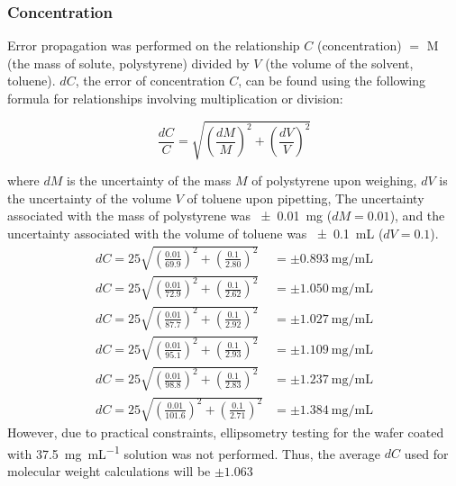 \documentclass[twocolumn]{article}
\begin{document}
                \subsubsection{Concentration}
                    Error propagation was performed on the relationship $C$ (concentration) $=$ M (the mass of solute, polystyrene) divided by $V$ (the volume of the solvent, toluene). $dC$, the error of concentration $C$, can be found using the following formula for relationships involving multiplication or division: 
                    
                    \begin{equation}
                        \frac{dC}{C} = \sqrt{(\frac{dM}{M})^2 + (\frac{dV}{V})^2}
                    \end{equation}
                    
                    where $dM$ is the uncertainty of the mass $M$ of polystyrene upon weighing, $dV$ is the uncertainty of the volume $V$ of toluene upon pipetting, The uncertainty associated with the mass of polystyrene was \qty{\pm 0.01}{\milli\gram} ($dM = 0.01$), and the uncertainty associated with the volume of toluene was \qty{\pm 0.1}{\milli\liter} ($dV = 0.1$). 
                    \begin{align}
                        dC = 25\sqrt{(\frac{0.01}{69.9})^2 + (\frac{0.1}{2.80})^2} &= \pm \qty{0.893}{\milli\gram\per\milli\liter}\\
                        dC = 25\sqrt{(\frac{0.01}{72.9})^2 + (\frac{0.1}{2.62})^2} &= \pm \qty{1.050}{\milli\gram\per\milli\liter}\\
                        dC = 25\sqrt{(\frac{0.01}{87.7})^2 + (\frac{0.1}{2.92})^2} &= \pm \qty{1.027}{\milli\gram\per\milli\liter}\\
                        dC = 25\sqrt{(\frac{0.01}{95.1})^2 + (\frac{0.1}{2.93})^2} &= \pm \qty{1.109}{\milli\gram\per\milli\liter}\\
                        dC = 25\sqrt{(\frac{0.01}{98.8})^2 + (\frac{0.1}{2.83})^2} &= \pm \qty{1.237}{\milli\gram\per\milli\liter}\\
                        dC = 25\sqrt{(\frac{0.01}{101.6})^2 + (\frac{0.1}{2.71})^2} &= \pm \qty{1.384}{\milli\gram\per\milli\liter}
                    \end{align}
                    However, due to practical constraints, ellipsometry testing for the wafer coated with \qty{37.5}{\milli\gram\per\milli\liter} solution was not performed. Thus, the average $dC$ used for molecular weight calculations will be $\pm 1.063$
\end{document}
